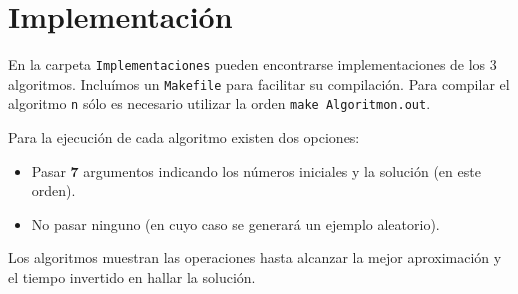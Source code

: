 \section{Implementación}

En la carpeta \texttt{Implementaciones} pueden encontrarse implementaciones de
los 3 algoritmos. Incluímos un \texttt{Makefile} para facilitar su compilación.
Para compilar el algoritmo \texttt{n} sólo es necesario utilizar la orden
\texttt{make Algoritmon.out}.

Para la ejecución de cada algoritmo existen dos opciones:

\begin{itemize}
  \item Pasar \textbf{7} argumentos indicando los números iniciales y la
  solución (en este orden).
  \item No pasar ninguno (en cuyo caso se generará un ejemplo aleatorio).
\end{itemize}

Los algoritmos muestran las operaciones hasta alcanzar la mejor aproximación y
el tiempo invertido en hallar la solución.
